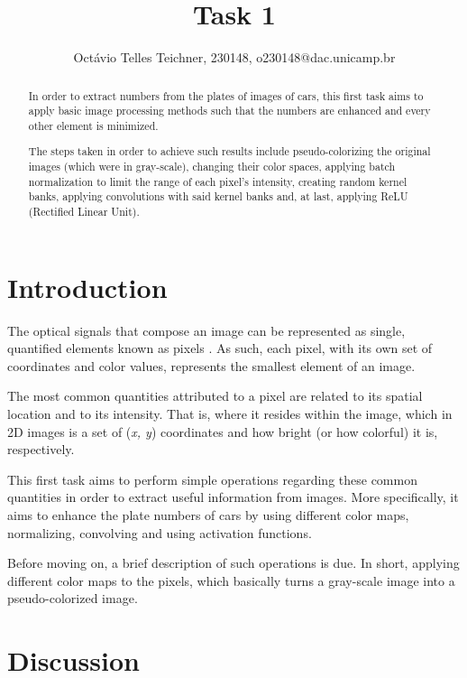 \documentclass[11pt]{IEEEtran}
\begin{document}
\title{Task 1}
\author{
Octávio Telles Teichner, 230148, o230148@dac.unicamp.br
}
\maketitle
    
\begin{abstract}

In order to extract numbers from the plates of images of cars, this first task aims to apply basic image processing methods such that the numbers are enhanced and every other element is minimized. 

The steps taken in order to achieve such results include pseudo-colorizing the original images (which were in gray-scale), changing their color spaces, applying batch normalization to limit the range of each pixel's intensity, creating random kernel banks, applying convolutions with said kernel banks and, at last, applying ReLU (Rectified Linear Unit).
\end{abstract}

\section{Introduction}

The optical signals that compose an image can be represented as single, quantified elements known as pixels \cite{foley1982fundamentals}. As such, each pixel, with its own set of coordinates and color values, represents the smallest element of an image.

The most common quantities attributed to a pixel are related to its spatial location and to its intensity. That is, where it resides within the image, which in 2D images is a set of (\textit{x, y}) coordinates and how bright (or how colorful) it is, respectively.

This first task aims to perform simple operations regarding these common quantities in order to extract useful information from images. More specifically, it aims to enhance the plate numbers of cars by using different color maps, normalizing, convolving and using activation functions.





Before moving on, a brief description of such operations is due. In short, 
applying different color maps to the pixels, which basically turns a gray-scale image into a pseudo-colorized image.

\section{Discussion}
\end{document}
